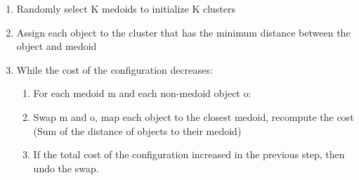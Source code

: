 \documentclass[a4paper, 12pt]{article}
\begin{document}
\begin{enumerate}
    \item Randomly select K medoids to initialize K clusters
    \item Assign each object to the cluster that has the minimum distance between the object and medoid
    \item While the cost of the configuration decreases:
    \begin{enumerate}
        \item For each medoid m and each non-medoid object o:
        \item Swap m and o, map each object to the closest medoid, recompute the cost (Sum of the distance of objects to their medoid)
        \item If the total cost of the configuration increased in the previous step, then undo the swap.
    \end{enumerate}
\end{enumerate}
\end{document}
